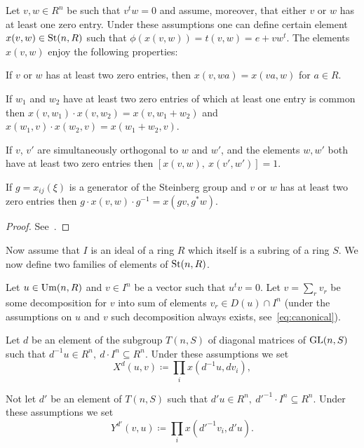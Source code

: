 \begin{lemma}
    \label{lem:xsmall-properties}
    Let $v, w \in R^n$ be such that $v^t w = 0$ and assume, moreover, that either $v$ or $w$ has at least one zero entry.
    Under these assumptions one can define certain element $x(v, w) \in \operatorname{St}(n, R)$ such that $\phi(x(v, w)) = t(v, w) = e + vw^t$.
    The elements $x(v, w)$ enjoy the following properties:
    \begin{lemlist}
        \item \label{itm:xsmall-scalar} If $v$ or $w$ has at least two zero entries, then $x(v, wa) = x(va, w)$ for $a\in R$.
        \item \label{itm:xsmall-additivity} If $w_1$ and $w_2$ have at least two zero entries of which at least one entry is common
        then $x(v, w_1) \cdot x(v, w_2) = x(v, w_1+w_2)$ and $x(w_1, v) \cdot x(w_2, v) = x(w_1 + w_2, v)$.
        \item \label{itm:xsmall-commute} If $v$, $v'$ are simultaneously orthogonal to $w$ and $w'$, and the elements $w, w'$ both have at least two zero entries then
        $[x(v, w),\ x(v', w')] = 1$.
        \item \label{itm:xsmall-conj} If $g = x_{ij}(\xi)$ is a generator of the Steinberg group and $v$ or $w$ has at least two zero entries then
        $g \cdot x(v, w) \cdot g^{-1} = x(gv, g^*w)$.
    \end{lemlist}
\end{lemma}
\begin{proof}
    See~\cite[Lemma~1.1]{Tu83}.
\end{proof}

Now assume that $I$ is an ideal of a ring $R$ which itself is a subring of a ring $S$.
We now define two families of elements of $\operatorname{St}(n, R)$.
\begin{dfn}
    Let $u \in \operatorname{Um}(n, R)$ and $v \in I^n$ be a vector such that $u^{t}v = 0$.
    Let $v = \sum_r v_r$ be some decomposition for $v$ into sum of elements $v_r \in D(u) \cap I^n$
    (under the assumptions on $u$ and $v$ such decomposition always exists, see~\eqref{eq:canonical}).

    Let $d$ be an element of the subgroup $T(n, S)$ of diagonal matrices of $\operatorname{GL}(n, S)$ such that
    $d^{-1}u \in R^n,\ d \cdot I^n \subseteq R^n.$
    Under these assumptions we set
    \begin{equation*}
        X^d(u, v) \coloneqq \prod_i x(d^{-1}u, dv_i),
    \end{equation*}

    Not let $d'$ be an element of $T(n, S)$ such that $d' u\in R^n,\ {d'}^{-1} \cdot I^n \subseteq R^n$.
    Under these assumptions we set
    \begin{equation*}
        Y^{d'}(v, u) \coloneqq \prod_i x({d'}^{-1} v_i, {d'}u).
    \end{equation*}
\end{dfn}

